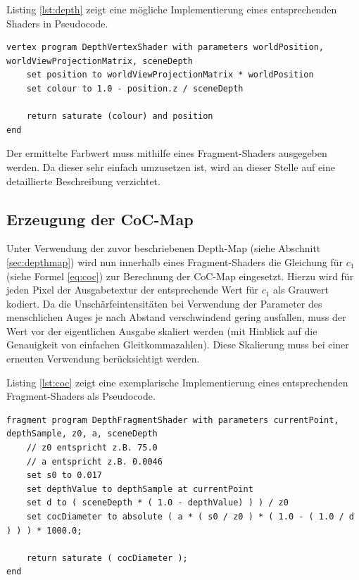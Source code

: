 \documentclass{acmsiggraph}                     %
\begin{document}
Listing \ref{lst:depth} zeigt eine mögliche Implementierung eines entsprechenden Shaders in Pseudocode. 

\begin{lstlisting}[caption=Pseudocode fur den Vertex-Shader zur Erzeugung der Depth-Map.,language=pseudo,label={lst:depth}]
vertex program DepthVertexShader with parameters worldPosition, worldViewProjectionMatrix, sceneDepth
	set position to worldViewProjectionMatrix * worldPosition 
	set colour to 1.0 - position.z / sceneDepth
	
	return saturate (colour) and position
end
\end{lstlisting}

Der ermittelte Farbwert muss mithilfe eines Fragment-Shaders ausgegeben werden. Da dieser sehr einfach umzusetzen ist, wird an dieser Stelle auf eine detaillierte Beschreibung verzichtet.

\subsection{Erzeugung der CoC-Map}

Unter Verwendung der zuvor beschriebenen Depth-Map (siehe Abschnitt \ref{sec:depthmap}) wird nun innerhalb eines Fragment-Shaders die Gleichung für $c_1$ (siehe Formel \ref{eq:coc}) zur Berechnung der CoC-Map eingesetzt. Hierzu wird für jeden Pixel der Ausgabetextur der entsprechende Wert für $c_1$ als Grauwert kodiert. Da die Unschärfeintensitäten bei Verwendung der Parameter des menschlichen Auges je nach Abstand verschwindend gering ausfallen, muss der Wert vor der eigentlichen Ausgabe skaliert werden (mit Hinblick auf die Genauigkeit von einfachen Gleitkommazahlen). Diese Skalierung muss bei einer erneuten Verwendung berücksichtigt werden.

Listing \ref{lst:coc} zeigt eine exemplarische Implementierung eines entsprechenden Fragment-Shaders als Pseudocode.

\begin{lstlisting}[caption=Pseudocode für den Fragment-Shader zur Berechnung der CoC-Map.,language=pseudo, label={lst:coc}]
fragment program DepthFragmentShader with parameters currentPoint, depthSample, z0, a, sceneDepth
	// z0 entspricht z.B. 75.0
	// a entspricht z.B. 0.0046
	set s0 to 0.017
	set depthValue to depthSample at currentPoint
	set d to ( sceneDepth * ( 1.0 - depthValue) ) ) / z0
	set cocDiameter to absolute ( a * ( s0 / z0 ) * ( 1.0 - ( 1.0 / d ) ) ) * 1000.0;
	
	return saturate ( cocDiameter );
end
\end{lstlisting}
\end{document}
